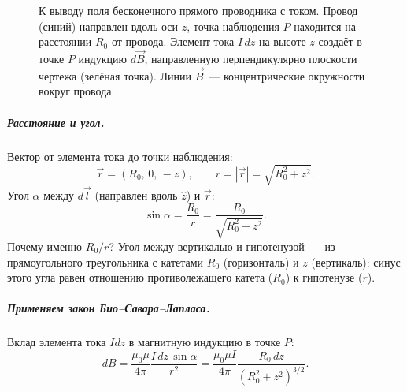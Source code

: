 \documentclass[12pt]{article}
\begin{document}
\begin{figure}[H]
\caption{К выводу поля бесконечного прямого проводника с током.
Провод (синий) направлен вдоль оси $z$, точка наблюдения $P$ находится
на расстоянии $R_0$ от провода. Элемент тока $I\,dz$ на высоте $z$
создаёт в точке $P$ индукцию $d\vec{B}$, направленную перпендикулярно
плоскости чертежа (зелёная точка). Линии $\vec{B}$~--- концентрические
окружности вокруг провода.}
\label{fig:biot-savart-wire}
\end{figure}

\subparagraph{Расстояние и угол.}
Вектор от элемента тока до точки наблюдения:
\[
    \vec{r} = (R_0,\, 0,\, -z), \qquad r = |\vec{r}| = \sqrt{R_0^2 + z^2}.
\]
Угол $\alpha$ между $d\vec{l}$ (направлен вдоль $\hat{z}$) и $\vec{r}$:
\[
    \sin\alpha = \frac{R_0}{r} = \frac{R_0}{\sqrt{R_0^2 + z^2}}.
\]
Почему именно $R_0/r$? Угол между вертикалью и гипотенузой~--- из прямоугольного
треугольника с катетами $R_0$ (горизонталь) и $z$ (вертикаль):
синус этого угла равен отношению противолежащего катета ($R_0$) к гипотенузе ($r$).

\subparagraph{Применяем закон Био--Савара--Лапласа.}
Вклад элемента тока $Idz$ в магнитную индукцию в точке $P$:
\[
    dB = \frac{\mu_0 \mu}{4\pi}\frac{I\,dz\,\sin\alpha}{r^2}
    = \frac{\mu_0 \mu I}{4\pi}\frac{R_0\,dz}{(R_0^2 + z^2)^{3/2}}.
\]
\end{document}
